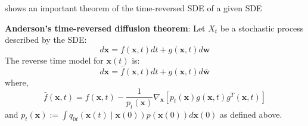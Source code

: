 \documentclass{article}
\newcommand{\x}{\mathbf{x}}
\newcommand{\w}{\mathbf{w}}
\begin{document}
\cite{anderson1982reverse} shows an important theorem of the time-reversed SDE of a given SDE
\begin{theorem}
    \textbf{Anderson's time-reversed diffusion theorem}: Let $X_t$ be a stochastic process described by the SDE:
    \begin{equation}
        d\x = f(\x,t)dt + g(\x, t)d\w
    \end{equation}
    The reverse time model for $\x(t)$ is:
    \begin{equation}
        d\x = \bar{f}(\x, t)dt + g(\x, t)d\bar{\w}
    \end{equation}
    where,
    \begin{equation}
        \bar{f}(\x, t) = f(\x, t) - \frac{1}{p_t(\x)}\nabla_{\x}[p_t(\x)g(\x, t)g^T(\x, t)]
    \end{equation}
    and $p_t(\x):= \int q_{0t}(\x(t)\mid\x(0))p(\x(0))d\x(0)$ as defined above.
\end{theorem}
\end{document}
